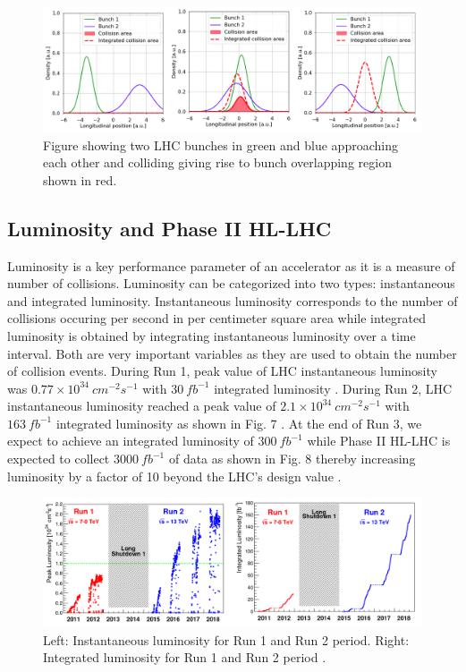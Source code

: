 \begin{figure}[H]
  \centering
  \includegraphics[width=\columnwidth]{./vdm_image.png}
  \caption{\onehalfspacing Figure showing two LHC bunches in green and blue approaching each other and colliding giving rise to bunch overlapping region shown in red.}
  \label{fig:CMS}
\end{figure}



\subsection{Luminosity and Phase II HL-LHC}
Luminosity is a key performance parameter of an accelerator as it is a measure of number of collisions. Luminosity can be categorized into two types: instantaneous and integrated luminosity. Instantaneous luminosity corresponds to the number of collisions occuring per second in per centimeter square area while integrated luminosity is obtained by integrating instantaneous luminosity over a time interval. Both are very important variables as they are used to obtain the number of collision events. During Run 1, peak value of LHC instantaneous luminosity was $0.77 \times 10^{34} \: cm^{-2} s^{-1} $ with $30 \: fb^{-1}$ integrated luminosity \cite{cmsrun1lumi}. During Run 2, LHC instantaneous luminosity reached a peak value of $2.1 \times 10^{34}  \: cm^{-2} s^{-1}$ with $163 \: fb^{-1}$ integrated luminosity as shown in Fig. 7 \cite{CMS:2018elu}. At the end of Run 3, we expect to achieve an integrated luminosity of $300 \:fb^{-1}$ while Phase II HL-LHC is expected to collect $3000 \:fb^{-1}$ of data as shown in Fig. 8 thereby increasing luminosity by a factor of 10 beyond the LHC's design value \cite{Dainese:2019rgk}. \\



\begin{figure}[H]
  \centering
  \includegraphics[width=1 \columnwidth]{./peakintlumi_run12.png}
  \caption{\onehalfspacing Left: Instantaneous luminosity for Run 1 and Run 2 period. Right: Integrated luminosity for Run 1 and Run 2 period \cite{lumi}.}
  \label{fig:LHClumi}
\end{figure}


